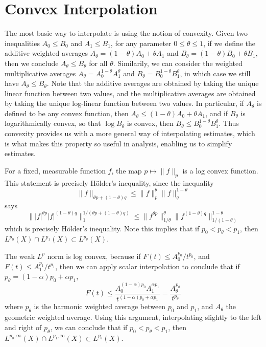 \section{Convex Interpolation}

The most basic way to interpolate is using the notion of convexity. Given two inequalities $A_0 \leq B_0$ and $A_1 \leq B_1$, for any parameter $0 \leq \theta \leq 1$, if we define the additive weighted averages $A_\theta = (1 - \theta) A_0 + \theta A_1$ and $B_\theta = (1 - \theta) B_0 + \theta B_1$, then we conclude $A_\theta \leq B_\theta$ for all $\theta$. Similarily, we can consider the weighted multiplicative averages $A_\theta = A_0^{1 - \theta} A_1^\theta$ and $B_\theta = B_0^{1 - \theta}B_1^\theta$, in which case we still have $A_\theta \leq B_\theta$. Note that the additive averages are obtained by taking the unique linear function between two values, and the multiplicative averages are obtained by taking the unique log-linear function between two values. In particular, if $A_\theta$ is defined to be any convex function, then $A_\theta \leq (1 - \theta) A_0 + \theta A_1$, and if $B_\theta$ is logarithmically convex, so that $\log B_\theta$ is convex, then $B_\theta \leq B_0^{1 - \theta} B_1^\theta$. Thus convexity provides us with a more general way of interpolating estimates, which is what makes this property so useful in analysis, enabling us to simplify estimates.

\begin{example}
    For a fixed, measurable function $f$, the map $p \mapsto \| f \|_p$ is a log convex function. This statement is precisely H\"{o}lder's inequality, since the inequality
    \[ \| f \|_{\theta p + (1 - \theta) q} \leq \| f \|_p^\theta \| f \|_{q}^{1-\theta} \]
    says
    \[ \| |f|^{\theta p} |f|^{(1 - \theta) q} \|_1^{1/(\theta p + (1 - \theta) q)} \leq \| f^{\theta p} \|_{1/\theta}^{\theta} \| f^{(1-\theta)q} \|_{1/(1-\theta)}^{1-\theta} \]
    which is precisely H\"{o}lder's inequality. Note this implies that if $p_0 < p_\theta < p_1$, then $L^{p_0}(X) \cap L^{p_1}(X) \subset L^{p_\theta}(X)$.
\end{example}

\begin{example}
    The weak $L^p$ norm is log convex, because if $F(t) \leq A_0^{p_0}/t^{p_0}$, and $F(t) \leq A_1^{p_1}/t^{p_1}$, then we can apply scalar interpolation to conclude that if $p_\theta = (1 - \alpha) p_0 + \alpha p_1$,
    \[ F(t) \leq \frac{A_0^{(1 - \alpha) p_0}A_1^{\alpha p_1}}{t^{(1 - \alpha)p_0 + \alpha p_1}} = \frac{A_\theta^{p_\theta}}{t^{p_\theta}} \]
    where $p_\theta$ is the harmonic weighted average between $p_0$ and $p_1$, and $A_\theta$ the geometric weighted average. Using this argument, interpolating slightly to the left and right of $p_\theta$, we can conclude that if $p_0 < p_\theta < p_1$, then $L^{p_0,\infty}(X) \cap L^{p_1,\infty}(X) \subset L^{p_\theta}(X)$.
\end{example}

